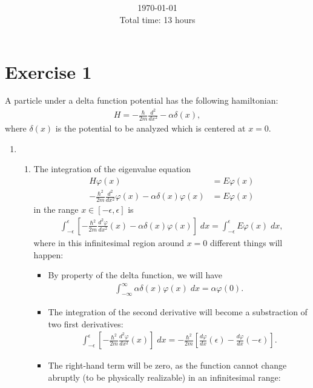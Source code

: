 \documentclass[letterpaper,11pt,twoside]{article}
\title{\textbf{\assignment}\\\course\\{\Large\institution}}
\author{\autor}
\date{\today\\Total time: 13 hours}
\begin{document}
\pagestyle{mainstyle}
\maketitle
\section{Exercise 1}%
A particle under a delta function potential has the following hamiltonian:
\begin{align}
  H=-\frac{\hbar}{2m}\frac{d^2}{dx^2}-\alpha\delta(x),
\end{align}
where $\delta(x)$ is the potential to be analyzed which is centered at $x=0$.
\begin{enumerate}[itemsep=0pt,topsep=0pt,label=(\alph*)]
  \item
  \begin{enumerate}[itemsep=0pt,topsep=0pt,label=(a.\arabic*)]
    \item The integration of the eigenvalue equation 
    \begin{align*}
      H\varphi(x)&=E\varphi(x)\\
      -\frac{\hbar^2}{2m}\frac{d^2}{dx^2}\varphi(x)-\alpha\delta(x)\varphi(x)&=E\varphi(x)
    \end{align*}
    in the range $x\in[-\epsilon,\epsilon]$ is 
    \begin{align*}
      \int_{-\epsilon}^\epsilon\left[-\frac{\hbar^2}{2m}\frac{d^2\varphi}{dx^2}(x)-\alpha\delta(x)\varphi(x)\right]\;dx=\int_{-\epsilon}^\epsilon E\varphi(x)\;dx,
    \end{align*}
    where in this infinitesimal region around $x=0$ different things will happen:
    \begin{itemize}
      \item By property of the delta function, we will have
      \begin{align}
        \int_{-\infty}^\infty \alpha\delta(x)\varphi(x)\;dx=\alpha\varphi(0).
      \end{align}
      \item The integration of the second derivative will become a substraction of two first derivatives:
      \begin{align}
        \int_{-\epsilon}^\epsilon\left[-\frac{\hbar^2}{2m}\frac{d^2\varphi}{dx^2}(x)\right]\;dx=-\frac{\hbar^2}{2m}\left[\frac{d\varphi}{dx}(\epsilon)
        -\frac{d\varphi}{dx}(-\epsilon)\right].
      \end{align}
      \item The right-hand term will be zero, as the function cannot change abruptly (to be physically realizable) in an infinitesimal range:

\end{itemize}
\end{enumerate}
\end{enumerate}
\end{document}
